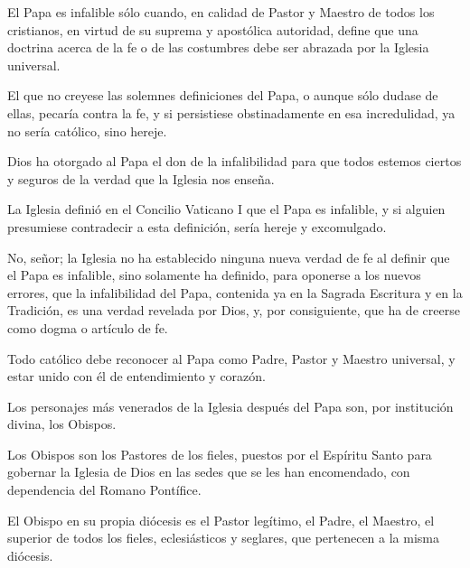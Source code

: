  El Papa es infalible sólo cuando, en calidad
de Pastor y Maestro de todos los cristianos, en virtud de su suprema y apostólica
autoridad, define que una doctrina acerca de la fe o de las costumbres debe ser
abrazada por la Iglesia universal.

 El que no creyese las solemnes definiciones del Papa, o aunque sólo
dudase de ellas, pecaría contra la fe, y si persistiese obstinadamente en esa
incredulidad, ya no sería católico, sino hereje.

 Dios
ha otorgado al Papa el don de la infalibilidad para que todos estemos ciertos y
seguros de la verdad que la Iglesia nos enseña.

 La Iglesia definió
en el Concilio Vaticano I que el Papa es infalible, y si alguien presumiese
contradecir a esta definición, sería hereje y excomulgado.

 No, señor; la Iglesia no ha establecido ninguna nueva verdad
de fe al definir que el Papa es infalible, sino solamente ha definido, para oponerse
a los nuevos errores, que la infalibilidad del Papa, contenida ya en la Sagrada
Escritura y en la Tradición, es una verdad revelada por Dios, y, por consiguiente,
que ha de creerse como dogma o artículo de fe.

 Todo católico
debe reconocer al Papa como Padre, Pastor y Maestro universal, y estar unido con
él de entendimiento y corazón.

 Los personajes más venerados de la Iglesia
después del Papa son, por institución divina, los Obispos.

 Los Obispos son los Pastores de los fieles,
puestos por el Espíritu Santo para gobernar la Iglesia de Dios en las sedes que se
les han encomendado, con dependencia del Romano Pontífice.

 El Obispo en su propia
diócesis es el Pastor legítimo, el Padre, el Maestro, el superior de todos los fieles, eclesiásticos y seglares, que pertenecen a la misma diócesis.

